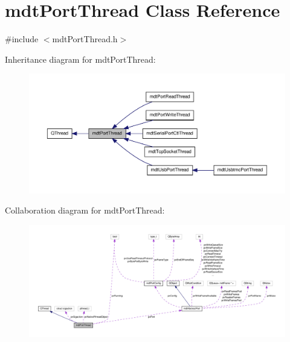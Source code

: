 \hypertarget{classmdt_port_thread}{\section{mdt\-Port\-Thread Class Reference}
\label{classmdt_port_thread}
}


{\ttfamily \#include $<$mdt\-Port\-Thread.\-h$>$}



Inheritance diagram for mdt\-Port\-Thread\-:
\nopagebreak
\begin{figure}[H]
\begin{center}
\leavevmode
\includegraphics[width=350pt]{classmdt_port_thread__inherit__graph}
\end{center}
\end{figure}


Collaboration diagram for mdt\-Port\-Thread\-:
\nopagebreak
\begin{figure}[H]
\begin{center}
\leavevmode
\includegraphics[width=350pt]{classmdt_port_thread__coll__graph}
\end{center}
\end{figure}
